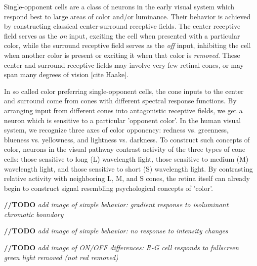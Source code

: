 \documentclass[journal,onecolumn]{IEEEtran}
\begin{document}
Single-opponent cells are a class of neurons in the early visual system which respond best to large areas of color and/or luminance. Their behavior is achieved by constructing classical center-surround receptive fields. The center receptive field serves as the \textit{on} input, exciting the cell when presented with a particular color, while the surround receptive field serves as the \textit{off} input, inhibiting the cell when another color is present or exciting it when that color is \textit{removed}. These center and surround receptive fields may involve very few retinal cones, or may span many degrees of vision [cite Haake].

In so called color preferring single-opponent cells, the cone inputs to the center and surround come from cones with different spectral response functions. By arranging input from different cones into antagonistic  receptive fields, we get a neuron which is sensitive to a particular 'opponent color'. In the human visual system, we recognize three axes of color opponency: redness vs. greenness, blueness vs. yellowness, and lightness vs. darkness. To construct such concepts of color, neurons in the visual pathway contrast activity of the three types of cone cells: those sensitive to long (L) wavelength light, those sensitive to medium (M) wavelength light, and those sensitive to short (S) wavelength light. By contrasting relative activity with neighboring L, M, and S cones, the retina itself can already begin to construct signal resembling psychological concepts of 'color'.

\textbf{//TODO} \textit{add image of simple behavior: gradient response to isoluminant chromatic boundary}

\textbf{//TODO} \textit{add image of simple behavior: no response to intensity changes}

\textbf{//TODO} \textit{add image of ON/OFF differences: R-G cell responds to fullscreen green light removed (not red removed)}
\end{document}
